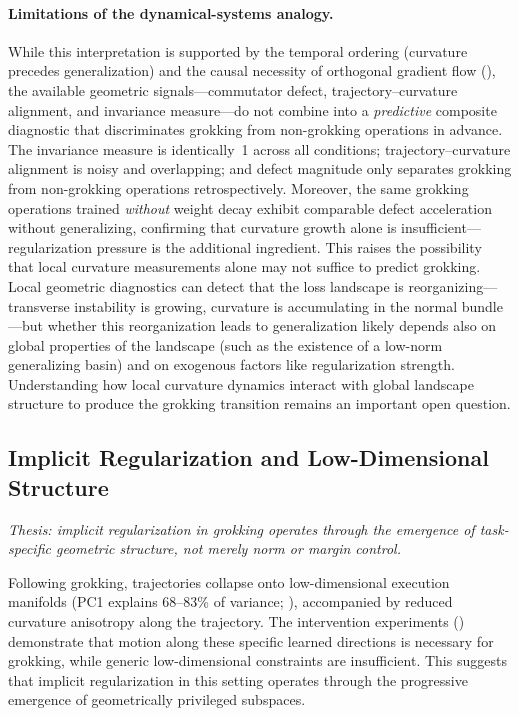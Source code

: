 \documentclass[11pt]{article}
\begin{document}
\paragraph{Limitations of the dynamical-systems analogy.}
While this interpretation is supported by the temporal ordering (curvature precedes generalization) and the causal necessity of orthogonal gradient flow (), the available geometric signals---commutator defect, trajectory--curvature alignment, and invariance measure---do not combine into a \emph{predictive} composite diagnostic that discriminates grokking from non-grokking operations in advance.
The invariance measure is identically~1 across all conditions; trajectory--curvature alignment is noisy and overlapping; and defect magnitude only separates grokking from non-grokking operations retrospectively.
Moreover, the same grokking operations trained \emph{without} weight decay exhibit comparable defect acceleration without generalizing, confirming that curvature growth alone is insufficient---regularization pressure is the additional ingredient.
This raises the possibility that local curvature measurements alone may not suffice to predict grokking.
Local geometric diagnostics can detect that the loss landscape is reorganizing---transverse instability is growing, curvature is accumulating in the normal bundle---but whether this reorganization leads to generalization likely depends also on global properties of the landscape (such as the existence of a low-norm generalizing basin) and on exogenous factors like regularization strength.
Understanding how local curvature dynamics interact with global landscape structure to produce the grokking transition remains an important open question.

\subsection{Implicit Regularization and Low-Dimensional Structure}
\label{sec:disc_regularization}

\emph{Thesis: implicit regularization in grokking operates through the emergence of task-specific geometric structure, not merely norm or margin control.}

Following grokking, trajectories collapse onto low-dimensional execution manifolds (PC1 explains 68--83\% of variance; ), accompanied by reduced curvature anisotropy along the trajectory.
The intervention experiments () demonstrate that motion along these specific learned directions is necessary for grokking, while generic low-dimensional constraints are insufficient.
This suggests that implicit regularization in this setting operates through the progressive emergence of geometrically privileged subspaces.
\end{document}
